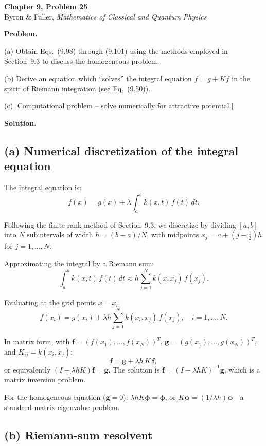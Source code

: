 \documentclass[12pt]{article}
\begin{document}
\begin{center}
{\Large\bfseries Chapter 9, Problem 25}\\[6pt]
Byron \& Fuller, \textit{Mathematics of Classical and Quantum Physics}
\end{center}

\bigskip

\textbf{Problem.}

(a) Obtain Eqs.~(9.98) through (9.101) using the methods employed in Section~9.3 to discuss the homogeneous problem.

(b) Derive an equation which ``solves'' the integral equation $f = g + Kf$ in the spirit of Riemann integration (see Eq.~(9.50)).

(c) [Computational problem -- solve numerically for attractive potential.]

\bigskip
\textbf{Solution.}

\subsection*{(a) Numerical discretization of the integral equation}

The integral equation is:
\[
f(x) = g(x) + \lambda\int_a^b k(x,t)\,f(t)\,dt. \tag{9.98}
\]

Following the finite-rank method of Section~9.3, we discretize by dividing $[a,b]$ into $N$ subintervals of width $h = (b-a)/N$, with midpoints $x_j = a + (j - \tfrac{1}{2})h$ for $j = 1, \ldots, N$.

Approximating the integral by a Riemann sum:
\[
\int_a^b k(x,t)\,f(t)\,dt \approx h\sum_{j=1}^N k(x, x_j)\,f(x_j). \tag{9.99}
\]

Evaluating at the grid points $x = x_i$:
\[
f(x_i) = g(x_i) + \lambda h\sum_{j=1}^N k(x_i, x_j)\,f(x_j), \quad i = 1, \ldots, N. \tag{9.100}
\]

In matrix form, with $\mathbf{f} = (f(x_1), \ldots, f(x_N))^T$, $\mathbf{g} = (g(x_1), \ldots, g(x_N))^T$, and $K_{ij} = k(x_i, x_j)$:
\[
\mathbf{f} = \mathbf{g} + \lambda h\,K\,\mathbf{f}, \tag{9.101}
\]
or equivalently $(I - \lambda h K)\mathbf{f} = \mathbf{g}$. The solution is $\mathbf{f} = (I - \lambda h K)^{-1}\mathbf{g}$, which is a matrix inversion problem.

For the homogeneous equation ($\mathbf{g} = 0$): $\lambda h K\boldsymbol{\phi} = \boldsymbol{\phi}$, or $K\boldsymbol{\phi} = (1/\lambda h)\boldsymbol{\phi}$---a standard matrix eigenvalue problem.

\subsection*{(b) Riemann-sum resolvent}
\end{document}
